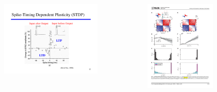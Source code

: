 \documentclass[10pt,aspectratio=43,mathserif, notes]{beamer}
\begin{document}
\begin{frame}
            \begin{columns}
            \begin{column}{0.4\textwidth}
            \begin{figure}[h]
            \centering
            \includegraphics[width=1\linewidth]{image/STDP.pdf}
            \end{figure}
            \end{column}
            \begin{column}{0.5\textwidth}
            \begin{figure}[h]
            \centering
            \includegraphics[width=1\linewidth]{image/STDP_2.pdf}

\end{figure}
\end{column}
\end{columns}
\end{frame}
\end{document}
